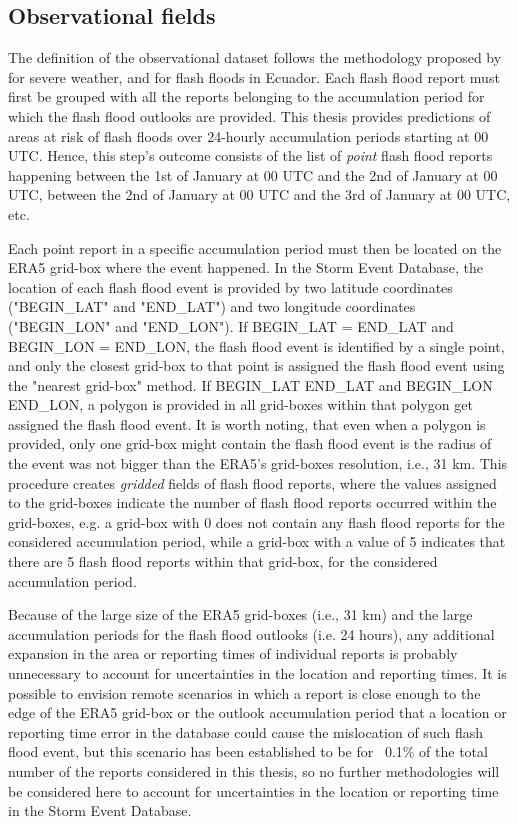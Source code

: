 \subsection{Observational fields}
The definition of the observational dataset follows the methodology proposed by \citep{Tsonevsky_2018} for severe weather, and \citep{Pillosu_2024} for flash floods in Ecuador. Each flash flood report must first be grouped with all the reports belonging to the accumulation period for which the flash flood outlooks are provided. This thesis provides predictions of areas at risk of flash floods over 24-hourly accumulation periods starting at 00 UTC. Hence, this step's outcome consists of the list of \textit{point} flash flood reports happening between the 1st of January at 00 UTC and the 2nd of January at 00 UTC, between the 2nd of January at 00 UTC and the 3rd of January at 00 UTC, etc. 

Each point report in a specific accumulation period must then be located on the ERA5 grid-box where the event happened. In the Storm Event Database, the location of each flash flood event is provided by two latitude coordinates ("BEGIN\_LAT" and "END\_LAT") and two longitude coordinates ("BEGIN\_LON" and "END\_LON"). If BEGIN\_LAT = END\_LAT and BEGIN\_LON = END\_LON, the flash flood event is identified by a single point, and only the closest grid-box to that point is assigned the flash flood event using the "nearest grid-box" method. If BEGIN\_LAT \ne END\_LAT and BEGIN\_LON \ne END\_LON, a polygon is provided in all grid-boxes within that polygon get assigned the flash flood event. It is worth noting, that even when a polygon is provided, only one grid-box might contain the flash flood event is the radius of the event was not bigger than the ERA5's grid-boxes resolution, i.e., 31 km. This procedure creates \textit{gridded} fields of flash flood reports, where the values assigned to the grid-boxes indicate the number of flash flood reports occurred within the grid-boxes, e.g. a grid-box with 0 does not contain any flash flood reports for the considered accumulation period, while a grid-box with a value of 5 indicates that there are 5 flash flood reports within that grid-box, for the considered accumulation period.

Because of the large size of the ERA5 grid-boxes (i.e., 31 km) and the large accumulation periods for the flash flood outlooks (i.e. 24 hours), any additional expansion in the area or reporting times of individual reports is probably unnecessary to account for uncertainties in the location and reporting times. It is possible to envision remote scenarios in which a report is close enough to the edge of the ERA5 grid-box or the outlook accumulation period that a location or reporting time error in the database could cause the mislocation of such flash flood event, but this scenario has been established to be for ~0.1\% of the total number of the reports considered in this thesis, so no further methodologies will be considered here to account for uncertainties in the location or reporting time in the Storm Event Database. 

